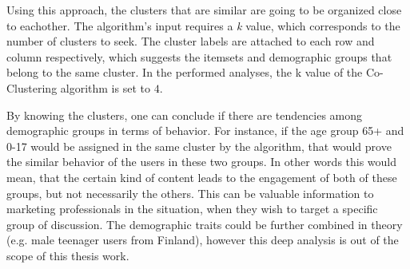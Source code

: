     Using this approach, the clusters that are similar are going to be organized close to eachother. The algorithm's input requires a \emph{k} value, which corresponds to the number of clusters to seek. The cluster labels are attached to each row and column respectively, which suggests the itemsets and demographic groups that belong to the same cluster. In the performed analyses, the k value of the Co-Clustering algorithm is set to $4$.  

    By knowing the clusters, one can conclude if there are tendencies among demographic groups in terms of behavior. For instance, if the age group 65+ and 0-17 would be assigned in the same cluster by the algorithm, that would prove the similar behavior of the users in these two groups. In other words this would mean, that the certain kind of content leads to the engagement of both of these groups, but not necessarily the others. This can be valuable information to marketing professionals in the situation, when they wish to target a specific group of discussion. The demographic traits could be further combined in theory (e.g. male teenager users from Finland), however this deep analysis is out of the scope of this thesis work. 
